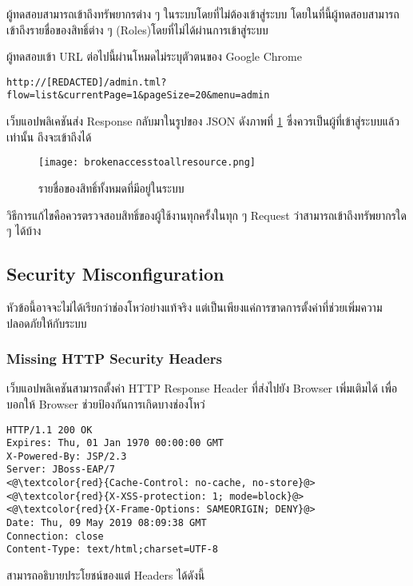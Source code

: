 ผู้ทดสอบสามารถเข้าถึงทรัพยากรต่าง ๆ ในระบบโดยที่ไม่ต้องเข้าสู่ระบบ โดยในที่นี้ผู้ทดสอบสามารถเข้าถึงรายชื่อของสิทธิ์ต่าง ๆ (Roles)โดยที่ไม่ได้ผ่านการเข้าสู่ระบบ

ผู้ทดสอบเข้า URL ต่อไปนี้ผ่านโหมดไม่ระบุตัวตนของ Google Chrome

\begin{lstlisting}[numbers=none] 
http://[REDACTED]/admin.tml?flow=list&currentPage=1&pageSize=20&menu=admin
\end{lstlisting}

เว็บแอปพลิเคชันส่ง Response กลับมาในรูปของ JSON ดังภาพที่ \ref{Fig:brokenaccesstoallresource.png}  ซึ่งควรเป็นผู้ที่เข้าสู่ระบบแล้วเท่านั้น ถึงจะเข้าถึงได้

 \begin{figure}[h]
	\centering
	\texttt{[image: brokenaccesstoallresource.png]}
	\caption{รายชื่อของสิทธิ์ทั้งหมดที่มีอยู่ในระบบ}
	\label{Fig:brokenaccesstoallresource.png}
\end{figure}

วิธีการแก้ไขคือควรตรวจสอบสิทธิ์ของผู้ใช้งานทุกครั้งในทุก ๆ Request ว่าสามารถเข้าถึงทรัพยากรใด ๆ ได้บ้าง

\subsection{Security Misconfiguration}

หัวข้อนี้อาจจะไม่ได้เรียกว่าช่องโหว่อย่างแท้จริง แต่เป็นเพียงแค่การขาดการตั้งค่าที่ช่วยเพิ่มความปลอดภัยให้กับระบบ

\subsubsection{Missing HTTP Security Headers}

 เว็บแอปพลิเคชันสามารถตั้งค่า HTTP Response Header ที่ส่งไปยัง Browser เพิ่มเติมได้ เพื่อบอกให้ Browser ช่วยป้องกันการเกิดบางช่องโหว่
 
 \begin{lstlisting}[numbers=none] 
HTTP/1.1 200 OK
Expires: Thu, 01 Jan 1970 00:00:00 GMT
X-Powered-By: JSP/2.3
Server: JBoss-EAP/7
<@\textcolor{red}{Cache-Control: no-cache, no-store}@>
<@\textcolor{red}{X-XSS-protection: 1; mode=block}@> 
<@\textcolor{red}{X-Frame-Options: SAMEORIGIN; DENY}@> 
Date: Thu, 09 May 2019 08:09:38 GMT
Connection: close
Content-Type: text/html;charset=UTF-8
 \end{lstlisting}
 
สามารถอธิบายประโยชน์ของแต่ Headers ได้ดังนี้

